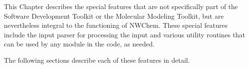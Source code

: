 \label{sec:utilities}

This Chapter describes the special features that are
not specifically part of the Software Development Toolkit or the Molecular
Modeling Toolkit, but are nevertheless integral to the functioning of NWChem.
These special features include the input parser for processing the input
and various utility routines that can be used by any module in the code, as
needed.

The following sections describe each of these features in detail.


